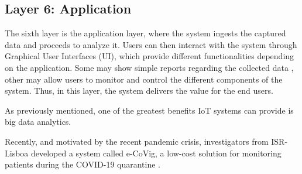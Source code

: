 
\subsection{Layer 6: Application}
\label{sec:iot-model-layer6}



The sixth layer is the application layer, where the system ingests the captured data and proceeds to analyze it. Users can then interact with the system through Graphical User Interfaces (UI), which provide different functionalities depending on the application. Some may show simple reports regarding the collected data \cite{Doukas2012, Wu2020}, other may allow users to monitor and control the different components of the system. Thus, in this layer, the system delivers the value for the end users.

As previously mentioned, one of the greatest benefits \acs{IoT} systems can provide is big data analytics. 

Recently, and motivated by the recent pandemic crisis, investigators from ISR-Lisboa developed a system called e-CoVig, a low-cost solution for monitoring patients during the COVID-19 quarantine \cite{}.  






